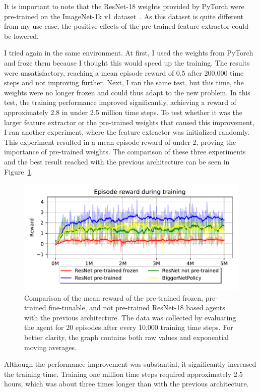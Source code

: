 \documentclass[
  digital,     %
  oneside,     %
  nosansbold,  %
  nocolorbold, %
  lof,         %
  lot,         %
]{fithesis4}
\begin{document}
It is important to note that the ResNet-18 weights provided by PyTorch were pre-trained on the ImageNet-1k v1 dataset~\cite{torchvision2016}. As this dataset is quite different from my use case, the positive effects of the pre-trained feature extractor could be lowered.

I tried again in the same environment. At first, I used the weights from PyTorch and froze them because I thought this would speed up the training. The results were unsatisfactory, reaching a mean episode reward of 0.5 after 200,000 time steps and not improving further. Next, I ran the same test, but this time, the weights were no longer frozen and could thus adapt to the new problem. In this test, the training performance improved significantly, achieving a reward of approximately 2.8 in under 2.5 million time steps.
To test whether it was the larger feature extractor or the pre-trained weights that caused this improvement, I ran another experiment, where the feature extractor was initialized randomly. This experiment resulted in a mean episode reward of under 2, proving the importance of pre-trained weights. The comparison of these three experiments and the best result reached with the previous architecture can be seen in Figure~\ref{fig:v4_resnet_graph}. 

\begin{figure}
    \includegraphics[width=1\linewidth]{graphs/v4_resnet_graph.pdf}
    \caption{Comparison of the mean reward of the pre-trained frozen, pre-trained fine-tunable, and not pre-trained ResNet-18 based agents with the previous architecture. The data was collected by evaluating the agent for 20 episodes after every 10,000 training time steps. For better clarity, the graph contains both raw values and exponential moving averages.}
    \label{fig:v4_resnet_graph}
\end{figure}

Although the performance improvement was substantial, it significantly increased the training time. Training one million time steps required approximately 2.5 hours, which was about three times longer than with the previous architecture.
\end{document}
